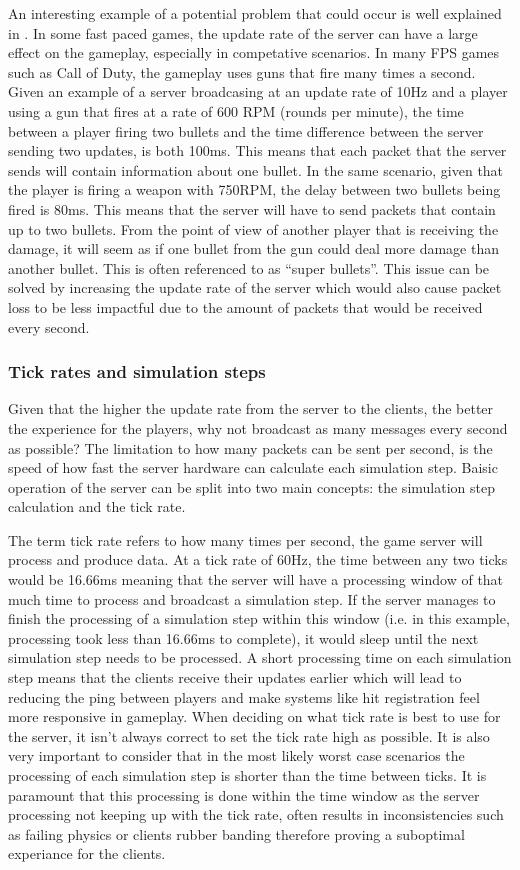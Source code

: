 An interesting example of a potential problem that could occur is well explained in . In some fast paced games, the update rate of the server can have a large effect on the gameplay, especially in competative scenarios. In many FPS games such as Call of Duty, the gameplay uses guns that fire many times a second. Given an example of a server broadcasing at an update rate of 10Hz and a player using a gun that fires at a rate of 600 RPM (rounds per minute), the time between a player firing two bullets and the time difference between the server sending two updates, is both 100ms. This means that each packet that the server sends will contain information about one bullet. In the same scenario, given that the player is firing a weapon with 750RPM, the delay between two bullets being fired is 80ms. This means that the server will have to send packets that contain up to two bullets. From the point of view of another player that is receiving the damage, it will seem as if one bullet from the gun could deal more damage than another bullet. This is often referenced to as ``super bullets''. This issue can be solved by increasing the update rate of the server which would also cause packet loss to be less impactful due to the amount of packets that would be received every second.


\subsubsection{Tick rates and simulation steps}
Given that the higher the update rate from the server to the clients, the better the experience for the players, why not broadcast as many messages every second as possible? The limitation to how many packets can be sent per second, is the speed of how fast the server hardware can calculate each simulation step. Baisic operation of the server can be split into two main concepts: the simulation step calculation and the tick rate.

The term tick rate refers to how many times per second, the game server will process and produce data. At a tick rate of 60Hz, the time between any two ticks would be 16.66ms meaning that the server will have a processing window of that much time to process and broadcast a simulation step. If the server manages to finish the processing of a simulation step within this window (i.e. in this example, processing took less than 16.66ms to complete), it would sleep until the next simulation step needs to be processed. A short processing time on each simulation step means that the clients receive their updates earlier which will lead to reducing the ping between players and make systems like hit registration feel more responsive in gameplay. When deciding on what tick rate is best to use for the server, it isn't always correct to set the tick rate high as possible. It is also very important to consider that in the most likely worst case scenarios the processing of each simulation step is shorter than the time between ticks. It is paramount that this processing is done within the time window as the server processing not keeping up with the tick rate, often results in inconsistencies such as failing physics or clients rubber banding therefore proving a suboptimal experiance for the clients.

